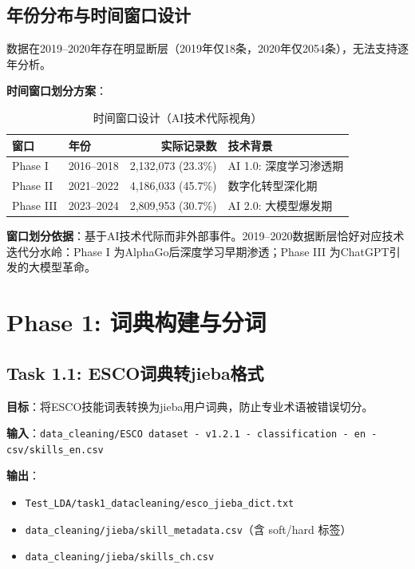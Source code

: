 \documentclass[12pt, a4paper]{ctexart}
\newenvironment{note}{%
  \begin{tcolorbox}[colback=blue!5, colframe=blue!50!black, boxrule=0.5pt, arc=2pt, breakable, title=\textbf{说明}]
}{%
  \end{tcolorbox}
}
\newenvironment{warning}{%
  \begin{tcolorbox}[colback=red!5, colframe=red!50!black, boxrule=0.5pt, arc=2pt, breakable, title=\textbf{注意}]
}{%
  \end{tcolorbox}
}
\begin{document}
\subsection{年份分布与时间窗口设计}

\begin{warning}
数据在2019--2020年存在明显断层（2019年仅18条，2020年仅2054条），无法支持逐年分析。
\end{warning}

\textbf{时间窗口划分方案}：

\begin{table}[h]
\centering
\caption{时间窗口设计（AI技术代际视角）}
\begin{tabular}{llrl}
\toprule
\textbf{窗口} & \textbf{年份} & \textbf{实际记录数} & \textbf{技术背景} \\
\midrule
Phase I & 2016--2018 & 2,132,073 (23.3\%) & AI 1.0: 深度学习渗透期 \\
Phase II & 2021--2022 & 4,186,033 (45.7\%) & 数字化转型深化期 \\
Phase III & 2023--2024 & 2,809,953 (30.7\%) & AI 2.0: 大模型爆发期 \\
\bottomrule
\end{tabular}
\end{table}

\begin{note}
\textbf{窗口划分依据}：基于AI技术代际而非外部事件。2019--2020数据断层恰好对应技术迭代分水岭：Phase I 为AlphaGo后深度学习早期渗透；Phase III 为ChatGPT引发的大模型革命。
\end{note}

\section{Phase 1: 词典构建与分词}

\subsection{Task 1.1: ESCO词典转jieba格式}

\textbf{目标}：将ESCO技能词表转换为jieba用户词典，防止专业术语被错误切分。

\textbf{输入}：\texttt{data\_cleaning/ESCO dataset - v1.2.1 - classification - en - csv/skills\_en.csv}

\textbf{输出}：
\begin{itemize}
    \item \texttt{Test\_LDA/task1\_datacleaning/esco\_jieba\_dict.txt}
    \item \texttt{data\_cleaning/jieba/skill\_metadata.csv}（含 soft/hard 标签）
    \item \texttt{data\_cleaning/jieba/skills\_ch.csv}
\end{itemize}
\end{document}
